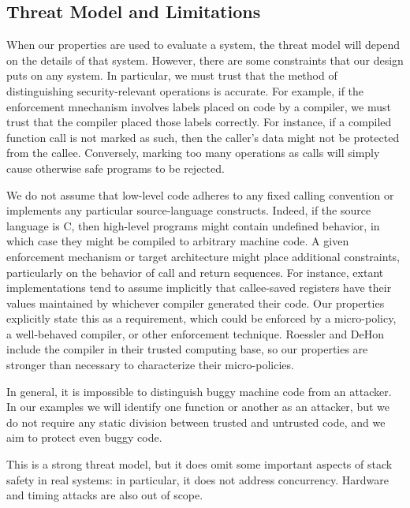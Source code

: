 \documentclass[10pt,conference]{ieeetran}%
\theoremstyle{definition}
\begin{document}
\subsection{Threat Model and Limitations}

When our properties are used to evaluate a system, the threat model
will depend on the details of that system. However, there are some
constraints that our design puts on any system. In particular, we must
trust that the method of distinguishing security-relevant operations
is accurate.  For example, if the enforcement mnechanism involves
labels placed on code by a compiler, we must trust that the compiler
placed those labels correctly. For instance, if a compiled function
call is not marked as such, then the caller's data might not be
protected from the callee.  Conversely, marking too many operations as
calls will simply cause otherwise safe programs to be rejected.


We do not assume that low-level code adheres to any fixed calling
convention or implements any particular source-language constructs.
Indeed, if the source
language is C, then high-level programs might contain undefined
behavior, in which case they might be compiled to arbitrary machine
code. A given enforcement 
mechanism or target architecture might place additional constraints, particularly on the behavior of
call and return sequences. For instance, extant implementations tend to assume
implicitly that callee-saved registers have their values maintained by whichever compiler
generated their code. Our properties explicitly state this as a requirement,
which could be enforced by a micro-policy, a well-behaved compiler, or other enforcement technique.
Roessler and DeHon include the compiler in their trusted computing
base, so our properties 
are stronger than necessary to characterize their micro-policies.

In general, it is impossible to distinguish buggy machine code from an
attacker.  In our examples we will identify one function or another as
an attacker, but we do not require any static division between trusted
and untrusted code, and we aim to protect even buggy code.

This is a strong threat model, but it does omit some important aspects
of stack safety in real systems: in particular, it does not address
concurrency.  Hardware and timing attacks are also out of scope.
%
\end{document}
